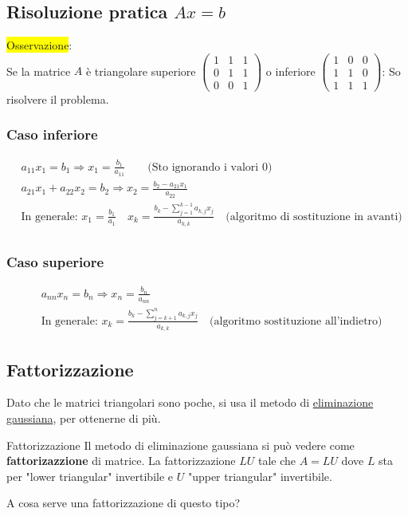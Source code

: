 \documentclass{article}
\begin{document}
\subsection{Risoluzione pratica $Ax=b$}
\colorbox{yellow}{Osservazione}:\\Se la matrice $A$ è triangolare superiore $\begin{pmatrix}
        1 & 1 & 1 \\
        0 & 1 & 1 \\
        0 & 0 & 1
    \end{pmatrix}$ o inferiore $\begin{pmatrix}
        1 & 0 & 0 \\
        1 & 1 & 0 \\
        1 & 1 & 1
    \end{pmatrix}$: So risolvere il problema.

\subsubsection{Caso inferiore}
\begin{align*}
     & a_{11}x_1=b_1\Rightarrow x_1=\frac{b_1}{a_{11}}\qquad\text{(Sto ignorando i valori $0$)}                                                                   \\
     & a_{21}x_1+a_{22}x_2=b_2\Rightarrow x_2=\frac{b_2-a_{21}x_1}{a_{22}}                                                                                        \\
     & \text{In generale: }x_1=\frac{b_1}{a_{1}}\quad x_k=\boxed{\frac{b_k-\sum_{j=1}^{k-1}a_{k,j}x_j}{a_{k,k}}}\quad\text{(algoritmo di sostituzione in avanti)} \\
\end{align*}

\subsubsection{Caso superiore}
\begin{align*}
     & a_{nn}x_n=b_n\Rightarrow x_n=\frac{b_n}{a_{nn}}                                                                                   \\
     & \text{In generale: }x_{k}=\boxed{\frac{b_k-\sum_{j=k+1}^{n}a_{k,j}x_j}{a_{k,k}}}\quad\text{(algoritmo sostituzione all'indietro)}
\end{align*}

\subsection{Fattorizzazione}
Dato che le matrici triangolari sono poche, si usa il metodo di \underline{eliminazione gaussiana}, per ottenerne di più.
\begin{defi}{Fattorizzazione}{}
    Il metodo di eliminazione gaussiana si può vedere come \textbf{fattorizazzione} di matrice. La fattorizzazione $LU$ tale che
    $A=LU$ dove $L$ sta per "lower triangular" invertibile e $U$ "upper triangular" invertibile.
\end{defi}
A cosa serve una fattorizzazione di questo tipo?
\end{document}
